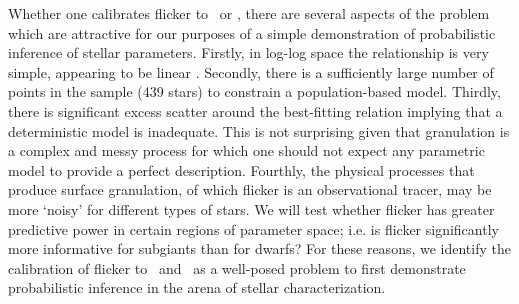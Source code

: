 Whether one calibrates flicker to \logg\ or \rhostar, there are several aspects
of the problem which are attractive for our purposes of a simple demonstration
of probabilistic inference of stellar parameters.
Firstly, in log-log space the relationship is very simple, appearing to be
linear \citep{kipping:2014}.
Secondly, there is a sufficiently large number of points in the sample (439
stars) to constrain a population-based model.
Thirdly, there is significant excess scatter around the best-fitting relation
implying that a deterministic model is inadequate.
This is not surprising given that granulation is a complex and messy process
for which one should not expect any parametric model to provide a perfect
description.
Fourthly, the physical processes that produce surface granulation, of which
flicker is an observational tracer, may be more `noisy' for different types of
stars.
We will test whether flicker has greater predictive power in certain regions
of parameter space; i.e. is flicker significantly more informative for
subgiants than for dwarfs?
For these reasons, we identify the calibration of
flicker to \logg\ and \rhostar\ as a well-posed problem to first demonstrate
probabilistic inference in the arena of stellar characterization.
